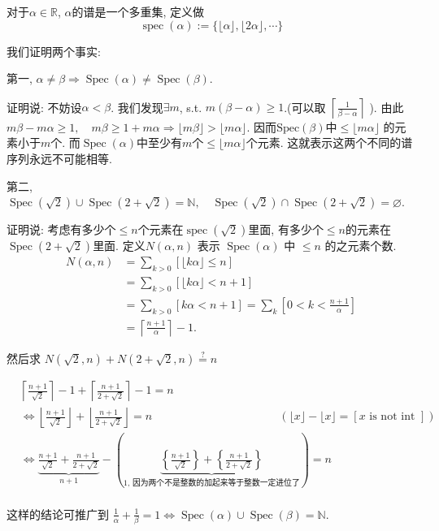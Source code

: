 \documentclass{ctexart}
\begin{document}
\begin{example}
    对于$\alpha \in \mathbb{R}$, $\alpha$的谱是一个多重集, 定义做
    $$
\operatorname{spec}(\alpha):=\{\lfloor\alpha\rfloor,\lfloor 2 \alpha\rfloor, \cdots\}
$$

我们证明两个事实: 

第一, $\alpha \neq \beta \Rightarrow \operatorname{Spec}(\alpha) \neq \operatorname{Spec}(\beta)$. 

证明说: 不妨设$\alpha<\beta$. 我们发现$\exists m$, s.t. $m(\beta-\alpha) \geqslant 1$.(可以取 $\left\lceil\frac{1}{\beta-\alpha}\right\rceil$ ). 由此$m \beta-m \alpha \geqslant 1, \quad m \beta \geqslant 1+m \alpha \Rightarrow\lfloor m \beta\rfloor>\lfloor m \alpha\rfloor$. 因而$\text{Spec}(\beta)$中$\leqslant\lfloor m \alpha\rfloor$
的元素小于$m$个. 而$\operatorname{Spec}(\alpha)$中至少有$m$个$\leqslant\lfloor m \alpha\rfloor$个元素. 这就表示这两个不同的谱序列永远不可能相等.  

第二, $\operatorname{Spec}(\sqrt{2}) \cup \operatorname{Spec}(2+\sqrt{2})={\mathbb{N}}, \quad \operatorname{Spec}(\sqrt{2}) \cap \operatorname{Spec}(2+\sqrt{2})=\varnothing$. 

证明说: 考虑有多少个$\leq n$个元素在$\operatorname{spec}(\sqrt{2})$里面, 有多少个$\leqslant n$的元素在$\operatorname{Spec}(2+\sqrt{2})$里面. 定义$N(\alpha, n)$ 表示 $\operatorname{Spec}(\alpha)$ 中 $\leqslant n$ 的之元素个数.
$$
\begin{aligned}
N(\alpha, n) & =\sum_{k>0}[\lfloor k \alpha\rfloor \leqslant n] \\
& =\sum_{k>0}[\lfloor k \alpha\rfloor<n+1] \\
& =\sum_{k>0}[k \alpha<n+1]=\sum_k\left[0<k<\frac{n+1}{\alpha}\right] \\
& =\left\lceil\frac{n+1}{\alpha}\right\rceil-1 .
\end{aligned}
$$

然后求 $N(\sqrt{2}, n)+N(2+\sqrt{2}, n) \stackrel{?}{=} n$

$$
\begin{aligned}
& \left\lceil\frac{n+1}{\sqrt{2}}\right\rceil-1+\left\lceil\frac{n+1}{2+\sqrt{2}}\right\rceil-1=n \\
& \Leftrightarrow\left\lfloor\frac{n+1}{\sqrt{2}}\right\rfloor+\left\lfloor\frac{n+1}{2+\sqrt{2}}\right\rfloor=n \quad&(\lfloor x\rfloor-\lfloor x\rfloor=[x \text { is not int }]) \\
& \Leftrightarrow \underbrace{\frac{n+1}{\sqrt{2}}+\frac{n+1}{2+\sqrt{2}}}_{n+1}-(\underbrace{\left\{\frac{n+1}{\sqrt{2}}\right\}+\left\{\frac{n+1}{2+\sqrt{2}}\right\}}_{1\text{, 因为两个不是整数的加起来等于整数一定进位了}})=n \\
&
\end{aligned}
$$

这样的结论可推广到 $\frac{1}{\alpha}+\frac{1}{\beta}=1 \Leftrightarrow \operatorname{Spec}( \alpha)  \cup \operatorname{Spec} (\beta)= \mathbb{N}$.

\end{example}
\end{document}
